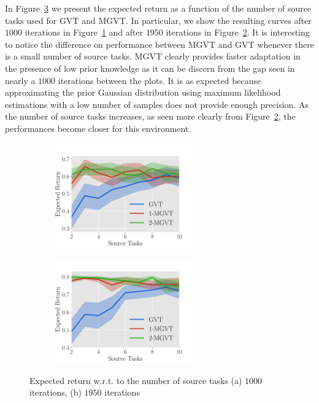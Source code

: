 \documentclass{article}
\begin{document}
In Figure~\ref{fig:sequential} we present the expected return as a function of the number of source tasks used for GVT and MGVT. In particular, we show the resulting curves after $1000$ iterations in Figure~\ref{fig:seq-1000} and after $1950$ iterations in Figure~\ref{fig:seq-1950}. It is interesting to notice the difference on performance between MGVT and GVT whenever there is a small number of source tasks. MGVT clearly provides faster adaptation in the presence of low prior knowledge as it can be discern from the gap seen in nearly a $1000$ iterations between the plots. It is as expected because approximating the prior Gaussian distribution using maximum likelihood estimations with a low number of samples does not provide enough precision. As the number of source tasks increases, as seen more clearly from Figure~\ref{fig:seq-1950}, the performances become closer for this environment.

\begin{figure}[t]
  \begin{subfigure}[b]{0.45\textwidth}
    \includegraphics[trim=0.0cm 0cm 1.2cm 1.3cm,clip=true,height=4.5cm]{images/sequential/lrew_1000.pdf}
    \caption{}
    \label{fig:seq-1000}
  \end{subfigure}
  \begin{subfigure}[b]{0.45\textwidth}
    \includegraphics[trim=0.0cm 0cm 1.2cm 1.3cm,clip=true,height=4.5cm]{images/sequential/lrew_1950.pdf}
    \caption{}
    \label{fig:seq-1950}
  \end{subfigure}
  \caption{Expected return w.r.t. to the number of source tasks (a) $1000$ iterations, (b) $1950$ iterations}
  \label{fig:sequential}
\end{figure}
\end{document}
